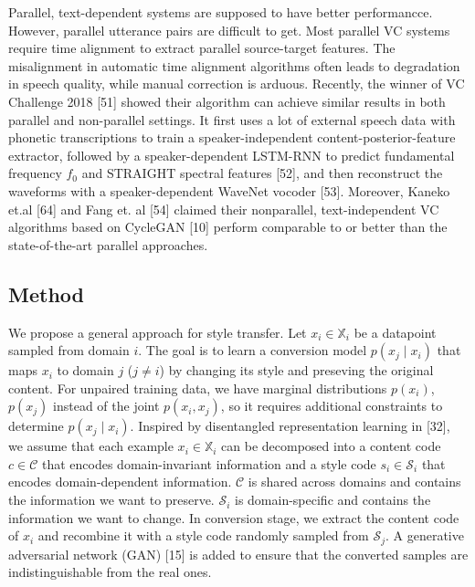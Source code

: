 \documentclass{article}
\begin{document}
Parallel, text-dependent systems are supposed to have better performancce. However, parallel utterance pairs are difficult to get. Most parallel VC systems require time alignment to extract parallel source-target features. The misalignment in automatic time alignment algorithms often leads to degradation in speech quality, while manual correction is arduous. Recently, the winner of VC Challenge 2018 [51] showed their algorithm can achieve similar results in both parallel and non-parallel settings. It first uses a lot of external speech data with phonetic transcriptions to train a speaker-independent content-posterior-feature extractor, followed by a speaker-dependent LSTM-RNN to predict fundamental frequency $f_0$ and STRAIGHT spectral features [52], and then reconstruct the waveforms with a speaker-dependent WaveNet vocoder [53]. Moreover, Kaneko et.al [64] and Fang et. al [54] claimed their nonparallel, text-independent VC algorithms based on CycleGAN [10] perform comparable to or better than the state-of-the-art parallel approaches.





\subsection{Method}
We propose a general approach for style transfer. %
Let $x_i \in \mathbb{X}_i$ be a datapoint sampled from domain $i$. The goal is to learn a conversion model $p(x_j \mid x_i)$ that maps $x_i$ to domain $j$ ($j\neq i$) by changing its style and preseving the original content. For unpaired training data, we have marginal distributions $p(x_i)$, $p(x_j)$ instead of the joint $p(x_i, x_j)$, so it requires additional constraints to determine $p(x_j\mid x_i)$. Inspired by disentangled representation learning in [32], we assume that each example $x_i \in \mathbb{X}_i$ can be decomposed into a content code $c\in \mathcal{C}$ that encodes domain-invariant information and a style code $s_i\in \mathcal{S}_i$ that encodes domain-dependent information. $\mathcal{C}$ is shared across domains and contains the information we want to preserve. $\mathcal{S}_i$ is domain-specific and contains the information we want to change. In conversion stage, we extract the content code of $x_i$ and recombine it with a style code randomly sampled from $\mathcal{S}_j$. A generative adversarial network (GAN) [15] is added to ensure that the converted samples are indistinguishable from the real ones.
\end{document}
